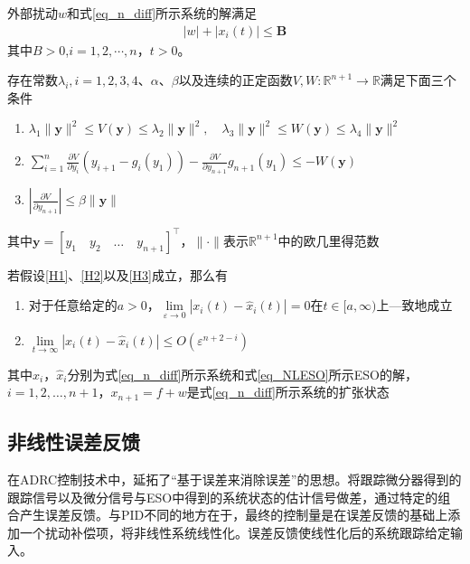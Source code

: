 \begin{assumption}
	外部扰动$w$和式\eqref{eq_n_diff}所示系统的解满足
	\begin{align}
	|w|+\left|x_{i}(t)\right| \leq \bm{B}
	\end{align}
	其中$ B>0 $,$ i=1,2,\cdots,n $，$ t>0 $。	\label{H2}
\end{assumption}
\begin{assumption}
	存在常数$ \lambda_i,i=1,2,3,4 $、$ \alpha $、$ \beta $以及连续的正定函数$ V,W:\mathbb{R}^{n+1} \rightarrow \mathbb{R} $满足下面三个条件
	\begin{enumerate}
		\item $ \lambda_{1}\|\bm{y}\|^{2} \leq V(\bm{y}) \leq \lambda_{2}\|\bm{y}\|^{2}, \quad \lambda_{3}\|\bm{y}\|^{2} \leq W(\bm{y}) \leq \lambda_{4}\|\bm{y}\|^{2} $ 
		\item $ \sum_{i=1}^{n} \frac{\partial V}{\partial y_{i}}\left(y_{i+1}-g_{i}\left(y_{1}\right)\right)-\frac{\partial V}{\partial y_{n+1}} g_{n+1}\left(y_{1}\right) \leq-W(\bm{y}) $ 
		\item $ \left|\frac{\partial V}{\partial y_{n+1}}\right| \leq \beta\|\bm{y}\| $		
	\end{enumerate}
	其中$\bm{y}=[y_{1} \quad y_{2} \quad \ldots \quad y_{n+1}]^{\top}$，$\|\cdot\|$表示$ \mathbb{R}^{n+1} $中的欧几里得范数	\label{H3}
\end{assumption}
\begin{theorem}
	若假设\ref{H1}、\ref{H2}以及\ref{H3}成立，那么有
	\begin{enumerate}
		\item 对于任意给定的$ a>0 $，$ \lim\limits_{\varepsilon \rightarrow 0}\left|x_{i}(t)-\hat{x}_{i}(t)\right|=0 $在$t \in [a, \infty)$上—致地成立	
		\item $ \lim\limits_{t \rightarrow \infty}\left|x_{i}(t)-\hat{x}_{i}(t)\right| \leq O\left(\varepsilon^{n+2-i}\right)  $
	\end{enumerate}
	其中$x_{i}$，$ \hat{x}_{i}$分别为式\eqref{eq_n_diff}所示系统和式\eqref{eq_NLESO}所示ESO的解，$i=1,2, \ldots, n+1$，$ x_{n+1}=f+w$是式\eqref{eq_n_diff}所示系统的扩张状态	\label{the_NLESO}
\end{theorem}
\subsection{非线性误差反馈}
在ADRC控制技术中，延拓了“基于误差来消除误差”的思想。将跟踪微分器得到的跟踪信号以及微分信号与ESO中得到的系统状态的估计信号做差，通过特定的组合产生误差反馈。与PID不同的地方在于，最终的控制量是在误差反馈的基础上添加一个扰动补偿项，将非线性系统线性化。误差反馈使线性化后的系统跟踪给定输入。

